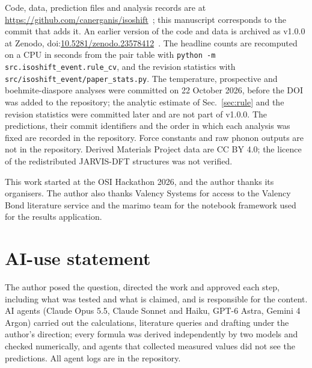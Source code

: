 \documentclass[aps,prmaterials,reprint,superscriptaddress,nofootinbib]{revtex4-2}
\begin{document}
Code, data, prediction files and analysis records are at \url{https://github.com/canerganis/isoshift}~\cite{IsoShiftGitHub}; this manuscript corresponds to the commit that adds it. An earlier version of the code and data is archived as v1.0.0 at Zenodo, doi:\href{https://doi.org/10.5281/zenodo.23578412}{10.5281/zenodo.23578412}~\cite{IsoShiftZenodo}. The headline counts are recomputed on a CPU in seconds from the pair table with \texttt{python -m src.isoshift\_event.rule\_cv}, and the revision statistics with \texttt{src/isoshift\_event/paper\_stats.py}. The temperature, prospective and boehmite-diaspore analyses were committed on 22 October 2026, before the DOI was added to the repository; the analytic estimate of Sec.~\ref{sec:rule} and the revision statistics were committed later and are not part of v1.0.0. The predictions, their commit identifiers and the order in which each analysis was fixed are recorded in the repository. Force constants and raw phonon outputs are not in the repository. Derived Materials Project data are CC BY 4.0; the licence of the redistributed JARVIS-DFT structures was not verified.

\begin{acknowledgments}
This work started at the OSI Hackathon 2026, and the author thanks its organisers. The author also thanks Valency Systems for access to the Valency Bond literature service and the marimo team for the notebook framework used for the results application.
\end{acknowledgments}

\section*{AI-use statement}

The author posed the question, directed the work and approved each step, including what was tested and what is claimed, and is responsible for the content. AI agents (Claude Opus 5.5, Claude Sonnet and Haiku, GPT-6 Astra, Gemini 4 Argon) carried out the calculations, literature queries and drafting under the author's direction; every formula was derived independently by two models and checked numerically, and agents that collected measured values did not see the predictions. All agent logs are in the repository.


\end{document}
